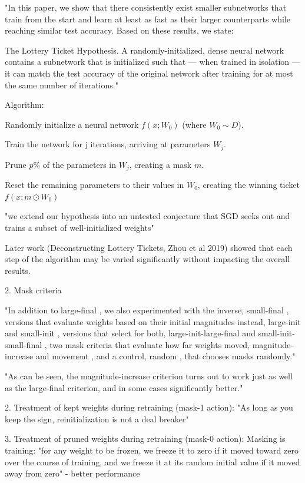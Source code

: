\documentclass[english]{article}
\begin{document}
"In this paper, we show that there consistently exist smaller subnetworks that train from the start and
learn at least as fast as their larger counterparts while reaching similar test accuracy. Based on these results, we state: 


The Lottery Ticket Hypothesis. A randomly-initialized, dense neural network contains a subnetwork that is initialized such that — when trained in isolation — it can match the test accuracy of the
original network after training for at most the same number of iterations."

Algorithm: 

\benum
\item  Randomly initialize a neural network $f(x;W_0)$ (where $W_0 \sim D$).
\item  Train the network for j iterations, arriving at parameters $W_j$.
\item  Prune $p$\% of the parameters in $W_j$, creating a mask $m$.
\item  Reset the remaining parameters to their values in $W_0$, creating the winning ticket $f(x;m\odot W_0)$
\eenum 

"we extend our hypothesis
into an untested conjecture that SGD seeks out and trains a subset of well-initialized weights"

\item Later work (Deconstructing Lottery Tickets, Zhou et al 2019) showed that each step of the algorithm may be varied significantly without impacting the overall results.

2. Mask criteria

"In addition to large-final , we also experimented with the inverse, small-final , versions that evaluate
weights based on their initial magnitudes instead, large-init and small-init , versions that select
for both, large-init-large-final and small-init-small-final , two mask criteria that evaluate how far
weights moved, magnitude-increase and movement , and a control, random , that chooses masks
randomly."

"As can be seen, the
magnitude-increase criterion turns out to work just as well as the large-final criterion, and in some
cases significantly better."

2. Treatment of kept weights during retraining (mask-1 action): "As long as you keep the sign, reinitialization is not a deal breaker"

3. Treatment of pruned weights during
retraining (mask-0 action): Masking is training: "for any weight to be frozen, we freeze it to zero if it moved
toward zero over the course of training, and we freeze it at its random initial value if it moved away from zero" - better performance
\end{document}
